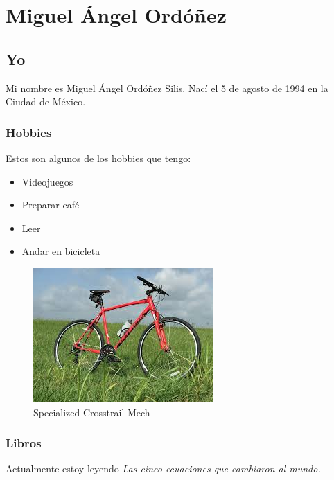 \chapter{Miguel Ángel Ordóñez}

\section{Yo}
Mi nombre es Miguel Ángel Ordóñez Silis. Nací el 5 de agosto de 1994 en la Ciudad de México.

\subsection{Hobbies}

Estos son algunos de los hobbies que tengo: 

\begin{itemize}
\item Videojuegos
\item Preparar café
\item Leer
\item Andar en bicicleta
\end{itemize}

\begin{figure}[h]
  \centering
  \includegraphics[scale=.5]{IMG27/27.jpg}
  \caption{Specialized Crosstrail Mech}
  \label{fig:bicicleta}
\end{figure}

\subsection{Libros}

Actualmente estoy leyendo \emph{Las cinco ecuaciones que cambiaron al mundo.~\cite{comunidad}}
